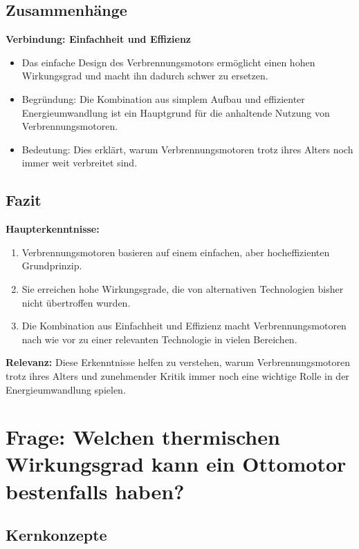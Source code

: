 \documentclass[a4paper,12pt]{article}
\begin{document}
\subsection{Zusammenhänge}

\textbf{Verbindung: Einfachheit und Effizienz}

\begin{itemize}
    \item Das einfache Design des Verbrennungsmotors ermöglicht einen hohen Wirkungsgrad und macht ihn dadurch schwer zu ersetzen.
    \item Begründung: Die Kombination aus simplem Aufbau und effizienter Energieumwandlung ist ein Hauptgrund für die anhaltende Nutzung von Verbrennungsmotoren.
    \item Bedeutung: Dies erklärt, warum Verbrennungsmotoren trotz ihres Alters noch immer weit verbreitet sind.
\end{itemize}

\subsection{Fazit}

\textbf{Haupterkenntnisse:}

\begin{enumerate}
    \item Verbrennungsmotoren basieren auf einem einfachen, aber hocheffizienten Grundprinzip.
    \item Sie erreichen hohe Wirkungsgrade, die von alternativen Technologien bisher nicht übertroffen wurden.
    \item Die Kombination aus Einfachheit und Effizienz macht Verbrennungsmotoren nach wie vor zu einer relevanten Technologie in vielen Bereichen.
\end{enumerate}

\textbf{Relevanz:} Diese Erkenntnisse helfen zu verstehen, warum Verbrennungsmotoren trotz ihres Alters und zunehmender Kritik immer noch eine wichtige Rolle in der Energieumwandlung spielen.



\section{Frage: Welchen thermischen Wirkungsgrad kann ein Ottomotor bestenfalls haben?}

\subsection{Kernkonzepte}
\end{document}
